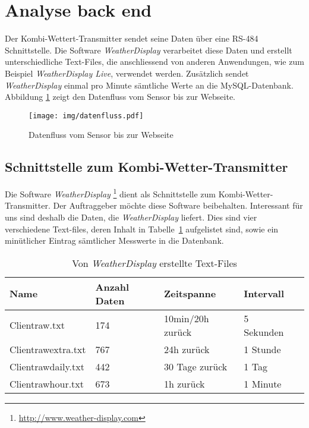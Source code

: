 \section{Analyse back end}
Der Kombi-Wettert-Transmitter sendet seine Daten über eine RS-484 Schnittstelle. Die Software \textit{WeatherDisplay} verarbeitet diese Daten und erstellt unterschiedliche Text-Files, die anschliessend von anderen Anwendungen, wie zum Beispiel \textit{WeatherDisplay Live}, verwendet werden. Zusätzlich sendet \textit{WeatherDisplay} einmal pro Minute sämtliche Werte an die MySQL-Datenbank. Abbildung \ref{img:datenfluss} zeigt den Datenfluss vom Sensor bis zur Webseite. 

\begin{figure}[h!]
	\centering
	\texttt{[image: img/datenfluss.pdf]}
	\caption{Datenfluss vom Sensor bis zur Webseite}
	\label{img:datenfluss}
\end{figure}



\subsection{Schnittstelle zum Kombi-Wetter-Transmitter}
Die Software \textit{WeatherDisplay} \footnote{ \url{http://www.weather-display.com}} dient als Schnittstelle zum Kombi-Wetter-Transmitter. Der Auftraggeber möchte diese Software beibehalten. Interessant für uns sind deshalb die Daten, die  \textit{WeatherDisplay} liefert. Dies sind vier verschiedene Text-files, deren Inhalt in Tabelle~\ref{table:text-files} aufgelistet sind, sowie ein minütlicher Eintrag sämtlicher Messwerte in die Datenbank.
\newline

\begin{table}[h]
\centering
\begin{tabular}{|l|l|l|l|l|}
\hline
 Name			&  Anzahl Daten	& 	Zeitspanne  		& 	Intervall			\\ \hline
 Clientraw.txt 		&  174			&  	10min/20h zurück 	& 	5 Sekunden 		\\ \hline
 Clientrawextra.txt	&  767 			&  	24h zurück 		& 	1 Stunde 			\\ \hline
 Clientrawdaily.txt 	&  442 			&  	30 Tage zurück 	&  	1 Tag 			\\ \hline
 Clientrawhour.txt	&  673			&  	1h zurück 			& 	1 Minute 			\\ \hline
\end{tabular}
\caption{Von \textit{WeatherDisplay} erstellte Text-Files}
\label{table:text-files}
\end{table}

